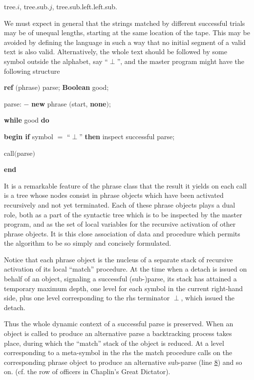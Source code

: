 \documentclass[twoside,11pt]{book}
\begin{document}
\quad tree.$i$, tree.sub.$j$, tree.sub.left.left.sub.

We must expect in general that the strings matched by different successful trials may be of unequal lengths, starting at the same location of the tape. This may be avoided by defining the language in such a way that no initial segment of a valid text is also valid. Alternatively, the whole text should be followed by some symbol outside the alphabet, say ``$\perp$'', and the master program might have the following structure

\quad \textbf{ref} $($phrase$)$ parse; \textbf{Boolean} good;

\quad parse: $-$ \textbf{new} phrase $($start, \textbf{none}$)$;

\quad \textbf{while} good \textbf{do}

\quad \textbf{begin if} symbol $=$ ``$\perp$'' \textbf{then} inspect successful parse;

\quad \quad call$($parse$)$

\quad \textbf{end}

It is a remarkable feature of the phrase class that the result it yields on each call is a tree whose nodes consist in phrase objects which have been activated recursively and not yet terminated. Each of these phrase objects plays a dual role, both as a part of the syntactic tree which is to be inspected by the master program, and as the set of local variables for the recursive activation of other phrase objects. It is this close association of data and procedure which permits the algorithm to be so simply and concisely formulated.

Notice that each phrase object is the nucleus of a separate stack of recursive activation of its local ``match'' procedure. At the time when a detach is issued on behalf of an object, signaling a successful (sub-)parse, its stack has attained a temporary maximum depth, one level for each symbol in the current right-hand side, plus one level corresponding to the rhs terminator $\perp$, which issued the detach.

Thus the whole dynamic context of a successful parse is preserved. When an object is called to produce an alternative parse a backtracking process takes place, during which the ``match'' stack of the object is reduced. At a level corresponding to a meta-symbol in the rhs the match procedure calls on the corresponding phrase object to produce an alternative sub-parse (line \hyperref[en:comment-label-8]{8}) and so on. (cf. the row of officers in Chaplin's Great Dictator).
\end{document}
